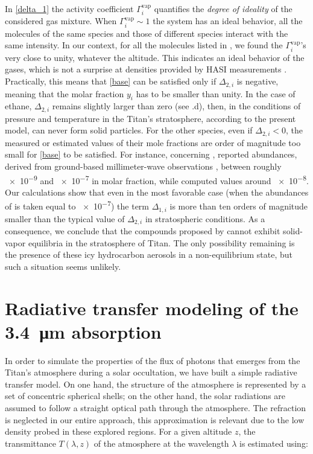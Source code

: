 \documentclass{arxiv-icarus}
\begin{document}
In \eqref{delta_1} the activity coefficient $\Gamma^\text{vap}_i$ quantifies the \emph{degree of ideality} of the considered gas mixture. When $\Gamma^\text{vap}_i \sim 1$ the system has an ideal behavior, \ie all the molecules of the same species and those of different species interact with the same intensity.
In our context, for all the molecules listed in , we found the $\Gamma^\text{vap}_i$'s very close to unity, whatever the altitude. This indicates an ideal behavior of the gases, which is not a surprise at densities provided by HASI measurements \citep{Fulchignoni2005}. Practically, this means that \eqref{base} can be satisfied only if $\Delta_{2,i}$ is negative, meaning that the molar fraction $y_i$ has to be smaller than unity.
In the case of ethane, $\Delta_{2,i}$ remains slightly larger than zero (see .d), then, in the conditions of pressure and temperature in the Titan's stratosphere, according to the present model,  can never form solid particles.
For the other species, even if $\Delta_{2,i} < 0$, the measured or estimated values of their mole fractions are order of magnitude too small for \eqref{base} to be satisfied.
For instance, concerning , \cite[see their Fig. 10 p279]{Lara1996} reported abundances, derived from ground-based millimeter-wave observations \citep{Bezard1993}, between roughly \num{e-9} and \num{e-7} in molar fraction, while \cite{Lavvas2008b,Lavvas2008c} computed values around \num{e-8}. Our calculations show that even in the most favorable case (\ie when the abundances of  is taken equal to \num{e-7}) the term $\Delta_{1,i}$ is more than ten orders of magnitude smaller than the typical value of $\Delta_{2,i}$ in stratospheric conditions.
As a consequence, we conclude that the compounds proposed by \cite{Kim2011} cannot exhibit solid-vapor equilibria in the stratosphere of Titan. The only possibility remaining is the presence of these icy hydrocarbon aerosols in a non-equilibrium state, but such a situation seems unlikely.


\section{Radiative transfer modeling of the \SI{3.4}{\um} absorption}
\label{gases}


In order to simulate the properties of the flux of photons that emerges from the Titan's atmosphere during a solar
occultation, we have built a simple radiative transfer model. On one hand, the structure of the atmosphere is represented by a
set of concentric spherical shells; on the other hand, the solar radiations are assumed to follow a straight optical path through
the atmosphere. The refraction is neglected in our entire approach, this approximation is relevant due to the low density probed in these explored regions. For a given altitude $z$, the transmittance $T(\lambda, z)$ of the atmosphere at the wavelength $\lambda$
is estimated using:
\end{document}
